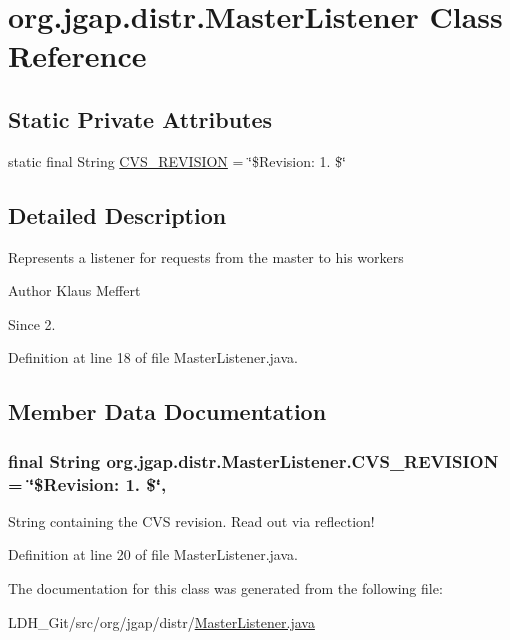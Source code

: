 \hypertarget{classorg_1_1jgap_1_1distr_1_1_master_listener}{\section{org.\-jgap.\-distr.\-Master\-Listener Class Reference}
\label{classorg_1_1jgap_1_1distr_1_1_master_listener}
}
\subsection*{Static Private Attributes}
\begin{DoxyCompactItemize}
\item 
static final String \hyperlink{classorg_1_1jgap_1_1distr_1_1_master_listener_afae6489d1191fe72ca80cfe264124ef9}{C\-V\-S\-\_\-\-R\-E\-V\-I\-S\-I\-O\-N} = \char`\"{}\$Revision\-: 1. \$\char`\"{}
\end{DoxyCompactItemize}


\subsection{Detailed Description}
Represents a listener for requests from the master to his workers

\begin{DoxyAuthor}{Author}
Klaus Meffert 
\end{DoxyAuthor}
\begin{DoxySince}{Since}
2. 
\end{DoxySince}


Definition at line 18 of file Master\-Listener.\-java.



\subsection{Member Data Documentation}
\hypertarget{classorg_1_1jgap_1_1distr_1_1_master_listener_afae6489d1191fe72ca80cfe264124ef9}{
\subsubsection[{C\-V\-S\-\_\-\-R\-E\-V\-I\-S\-I\-O\-N}]{\setlength{\rightskip}{0pt plus 5cm}final String org.\-jgap.\-distr.\-Master\-Listener.\-C\-V\-S\-\_\-\-R\-E\-V\-I\-S\-I\-O\-N = \char`\"{}\$Revision\-: 1. \$\char`\"{}\hspace{0.3cm}{\ttfamily [static]}, {\ttfamily [private]}}}\label{classorg_1_1jgap_1_1distr_1_1_master_listener_afae6489d1191fe72ca80cfe264124ef9}
String containing the C\-V\-S revision. Read out via reflection! 

Definition at line 20 of file Master\-Listener.\-java.



The documentation for this class was generated from the following file\-:\begin{DoxyCompactItemize}
\item 
L\-D\-H\-\_\-\-Git/src/org/jgap/distr/\hyperlink{_master_listener_8java}{Master\-Listener.\-java}\end{DoxyCompactItemize}
